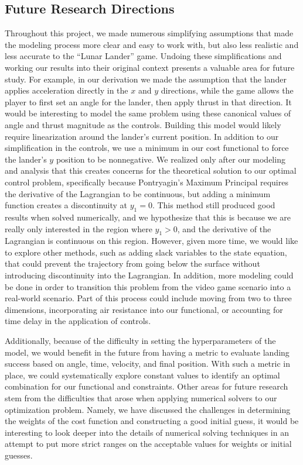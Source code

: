 \documentclass{article}
\begin{document}
\subsection{Future Research Directions}
Throughout this project, we made numerous simplifying assumptions that made the modeling process more clear and easy to work with, but also less realistic and less accurate to the ``Lunar Lander'' game. Undoing these simplifications and working our results into their original context presents a valuable area for future study. For example, in our derivation we made the assumption that the lander applies acceleration directly in the $x$ and $y$ directions, while the game allows the player to first set an angle for the lander, then apply thrust in that direction. It would be interesting to model the same problem using these canonical values of angle and thrust magnitude as the controls. Building this model would likely require linearization around the lander's current position. In addition to our simplification in the controls, we use a minimum in our cost functional to force the lander's $y$ position to be nonnegative. We realized only after our modeling and analysis that this creates concerns for the theoretical solution to our optimal control problem, specifically because Pontryagin's Maximum Principal requires the derivative of the Lagrangian to be continuous, but adding a minimum function creates a discontinuity at $y_1=0$. This method still produced good results when solved numerically, and we hypothesize that this is because we are really only interested in the region where $y_1 > 0$, and the derivative of the Lagrangian is continuous on this region. However, given more time, we would like to explore other methods, such as adding slack variables to the state equation, that could prevent the trajectory from going below the surface without introducing discontinuity into the Lagrangian. In addition, more modeling could be done in order to transition this problem from the video game scenario into a real-world scenario. Part of this process could include moving from two to three dimensions, incorporating air resistance into our functional, or accounting for time delay in the application of controls.

Additionally, because of the difficulty in setting the hyperparameters of the model, we would benefit in the future from having a metric to evaluate landing success based on angle, time, velocity, and final position. With such a metric in place, we could systematically explore constant values to identify an optimal combination for our functional and constraints.
Other areas for future research stem from the difficulties that arose when applying numerical solvers to our optimization problem. Namely, we have discussed the challenges in determining the weights of the cost function and constructing a good initial guess, it would be interesting to look deeper into the details of numerical solving techniques in an attempt to put more strict ranges on the acceptable values for weights or initial guesses.
\end{document}

